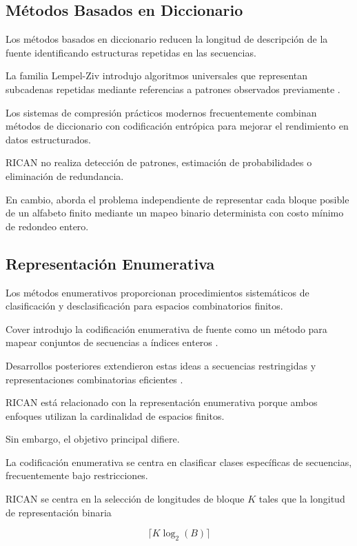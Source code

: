 \documentclass[onecolumn]{IEEEtran}
\begin{document}
\subsection{Métodos Basados en Diccionario}

Los métodos basados en diccionario reducen la longitud de descripción
de la fuente identificando estructuras repetidas en las secuencias.

La familia Lempel-Ziv introdujo algoritmos universales que representan
subcadenas repetidas mediante referencias a patrones observados
previamente \cite{ziv1977}.

Los sistemas de compresión prácticos modernos frecuentemente combinan
métodos de diccionario con codificación entrópica para mejorar el
rendimiento en datos estructurados.

RICAN no realiza detección de patrones, estimación de probabilidades o
eliminación de redundancia.

En cambio, aborda el problema independiente de representar cada bloque
posible de un alfabeto finito mediante un mapeo binario determinista
con costo mínimo de redondeo entero.

\subsection{Representación Enumerativa}

Los métodos enumerativos proporcionan procedimientos sistemáticos de
clasificación y desclasificación para espacios combinatorios finitos.

Cover introdujo la codificación enumerativa de fuente como un método
para mapear conjuntos de secuencias a índices enteros
\cite{cover1973}.

Desarrollos posteriores extendieron estas ideas a secuencias
restringidas y representaciones combinatorias eficientes
\cite{immink2004}.

RICAN está relacionado con la representación enumerativa porque ambos
enfoques utilizan la cardinalidad de espacios finitos.

Sin embargo, el objetivo principal difiere.

La codificación enumerativa se centra en clasificar clases específicas
de secuencias, frecuentemente bajo restricciones.

RICAN se centra en la selección de longitudes de bloque $K$ tales que
la longitud de representación binaria

\[
\lceil K\log_2(B)\rceil
\]
\end{document}
